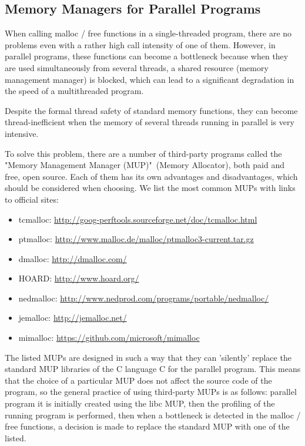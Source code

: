 { %
	\subsection{Memory Managers for Parallel Programs}
	\par When calling malloc / free functions in a single-threaded program, there are no problems even with a rather high call intensity of one of them. However, in parallel programs, these functions can become a bottleneck because when they are used simultaneously from several threads, a shared resource (memory management manager) is blocked, which can lead to a significant degradation in the speed of a multithreaded program.
	\par Despite the formal thread safety of standard memory functions, they can become thread-inefficient when the memory of several threads running in parallel is very intensive.
	\par To solve this problem, there are a number of third-party programs called the "Memory Management Manager (MUP)"\ (Memory Allocator), both paid and free, open source. Each of them has its own advantages and disadvantages, which should be considered when choosing. We list the most common MUPs with links to official sites:
	\begin{itemize}
		\sloppy
		\item tcmalloc: \url{http://goog-perftools.sourceforge.net/doc/tcmalloc.html}
		\item ptmalloc: \url{http://www.malloc.de/malloc/ptmalloc3-current.tar.gz}
		\item dmalloc: \url{http://dmalloc.com/}
		\item HOARD: \url{http://www.hoard.org/}
		\item nedmalloc: \url{http://www.nedprod.com/programs/portable/nedmalloc/}
		\item jemalloc: \url{http://jemalloc.net/}
		\item mimalloc: \url{https://github.com/microsoft/mimalloc}
	\end{itemize}
	\par The listed MUPs are designed in such a way that they can 'silently' replace the standard MUP libraries of the C language C for the parallel program. This means that the choice of a particular MUP does not affect the source code of the program, so the general practice of using third-party MUPs is as follows: parallel program it is initially created using the libc MUP, then the profiling of the running program is performed, then when a bottleneck is detected in the malloc / free functions, a decision is made to replace the standard MUP with one of the listed.
	\par
	\par
}